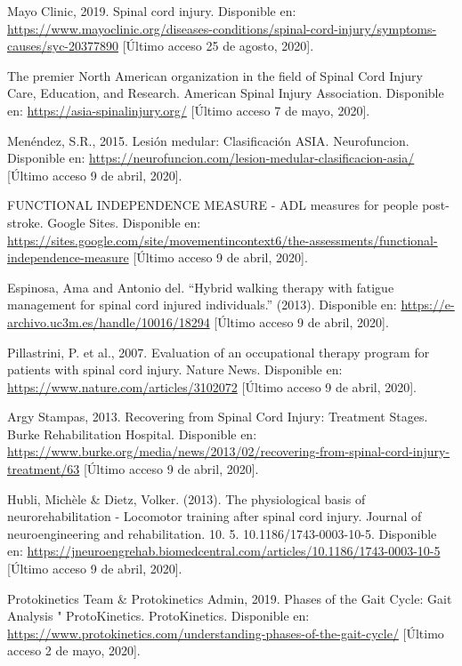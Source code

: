 \begin{thebibliography}{99}
 Mayo Clinic, 2019. Spinal cord injury. Disponible en: \url{https://www.mayoclinic.org/diseases-conditions/spinal-cord-injury/symptoms-causes/syc-20377890} [Último acceso 25 de agosto, 2020].

 The premier North American organization in the field of Spinal Cord Injury Care, Education, and Research. American Spinal Injury Association. Disponible en: \url{https://asia-spinalinjury.org/} [Último acceso 7 de mayo, 2020].

 Menéndez, S.R., 2015. Lesión medular: Clasificación ASIA. Neurofuncion.  Disponible en: \url{https://neurofuncion.com/lesion-medular-clasificacion-asia/} [Último acceso 9 de abril, 2020].

 FUNCTIONAL INDEPENDENCE MEASURE - ADL measures for people post-stroke. Google Sites. Disponible en: \url{https://sites.google.com/site/movementincontext6/the-assessments/functional-independence-measure} [Último acceso 9 de abril, 2020].

 Espinosa, Ama and Antonio del. “Hybrid walking therapy with fatigue management for spinal cord injured individuals.” (2013). Disponible en: \url{https://e-archivo.uc3m.es/handle/10016/18294} [Último acceso 9 de abril, 2020].


 Pillastrini, P. et al., 2007. Evaluation of an occupational therapy program for patients with spinal cord injury. Nature News. Disponible en: \url{https://www.nature.com/articles/3102072} [Último acceso 9 de abril, 2020].

 Argy Stampas, 2013. Recovering from Spinal Cord Injury: Treatment Stages. Burke Rehabilitation Hospital. Disponible en: \url{https://www.burke.org/media/news/2013/02/recovering-from-spinal-cord-injury-treatment/63} [Último acceso 9 de abril, 2020].

 Hubli, Michèle \& Dietz, Volker. (2013). The physiological basis of neurorehabilitation - Locomotor training after spinal cord injury. Journal of neuroengineering and rehabilitation. 10. 5. 10.1186/1743-0003-10-5.  Disponible en: \url{https://jneuroengrehab.biomedcentral.com/articles/10.1186/1743-0003-10-5} [Último acceso 9 de abril, 2020].

 Protokinetics Team \& Protokinetics Admin, 2019. Phases of the Gait Cycle: Gait Analysis " ProtoKinetics. ProtoKinetics. Disponible en: \url{https://www.protokinetics.com/understanding-phases-of-the-gait-cycle/} [Último acceso 2 de mayo, 2020].


\end{thebibliography}
